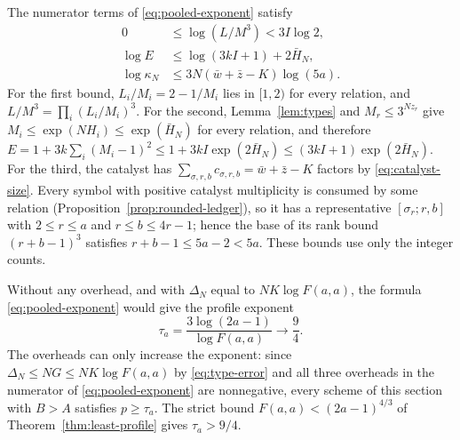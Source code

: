 The numerator terms of \eqref{eq:pooled-exponent} satisfy
\begin{equation}\label{eq:finite-cost-bounds}
 \begin{split}
 0&\le\log(L/M^3)<3I\log2,\\
 \log E&\le\log(3kI+1)+2\bar H_N,\\
 \log\kappa_N&\le3N(\bar w+\bar z-K)\log(5a).
 \end{split}
\end{equation}
For the first bound, \(L_i/M_i=2-1/M_i\) lies in \([1,2)\) for every
relation, and \(L/M^3=\prod_i(L_i/M_i)^3\). For the second,
Lemma~\ref{lem:types} and \(M_r\le3^{Nz_r}\) give
\(M_i\le\exp(NH_i)\le\exp(\bar H_N)\) for every relation, and therefore
\(E=1+3k\sum_i(M_i-1)^2\le1+3kI\exp(2\bar H_N)
\le(3kI+1)\exp(2\bar H_N)\). For the third, the catalyst has
\(\sum_{\sigma,r,b}c_{\sigma,r,b}=\bar w+\bar z-K\) factors by
\eqref{eq:catalyst-size}. Every symbol with positive catalyst multiplicity
is consumed by some relation (Proposition~\ref{prop:rounded-ledger}), so
it has a representative \([\sigma_r;r,b]\) with
\(2\le r\le a\) and \(r\le b\le4r-1\); hence the base of its rank bound
\((r+b-1)^3\) satisfies \(r+b-1\le5a-2<5a\). These bounds use only the
integer counts.

Without any overhead, and with \(\Delta_N\) equal to \(NK\log F(a,a)\),
the formula \eqref{eq:pooled-exponent} would give the profile exponent
\begin{equation}\label{eq:tau}
 \tau_a=\frac{3\log(2a-1)}{\log F(a,a)}
 \longrightarrow\frac94.
\end{equation}
The overheads can only increase the exponent: since
\(\Delta_N\le NG\le NK\log F(a,a)\) by \eqref{eq:type-error} and all three
overheads in the numerator of \eqref{eq:pooled-exponent} are nonnegative,
every scheme of this section with \(B>A\) satisfies \(p\ge\tau_a\).
The strict bound \(F(a,a)<(2a-1)^{4/3}\) of
Theorem~\ref{thm:least-profile} gives \(\tau_a>9/4\).
